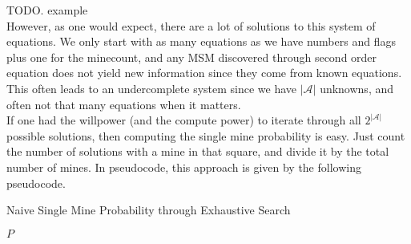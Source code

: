 TODO. example\\

However, as one would expect, there are a lot of solutions to this system of equations. We only start with as many equations as we have numbers and flags plus one for the minecount, and any MSM discovered through second order equation does not yield new information since they come from known equations. This often leads to an undercomplete system since we have $|\mathcal{A}|$ unknowns, and often not that many equations when it matters.\\ 

If one had the willpower (and the compute power) to iterate through all $2^{|\mathcal{A}|}$ possible solutions, then computing the single mine probability is easy. Just count the number of solutions with a mine in that square, and divide it by the total number of mines. In pseudocode, this approach is given by the following pseudocode.

\begin{algorithm}[h]
\caption*{Naive Single Mine Probability through Exhaustive Search}
\begin{algorithmic}
    \EndIf
    \EndIf
    \EndIf
\EndFor
{}
    \EndIf
\EndFor
{}
\EndFor
\Return $P$
\EndFunction
\end{algorithmic}
\end{algorithm}

